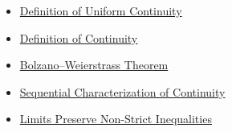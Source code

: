 \begin{dependencies}
\begin{itemize}
  \item \hyperref[def:uniform-continuity]{Definition of Uniform Continuity}
  \item \hyperref[def:continuity]{Definition of Continuity}
  \item \hyperref[thm:bolzano-weierstrass-sequences]{Bolzano--Weierstrass Theorem}
  \item \hyperref[thm:sequential-continuity]{Sequential Characterization of Continuity}
  \item \hyperref[thm:limits-preserve-inequalities]{Limits Preserve Non-Strict Inequalities}
\end{itemize}
\end{dependencies}

\clearpage
